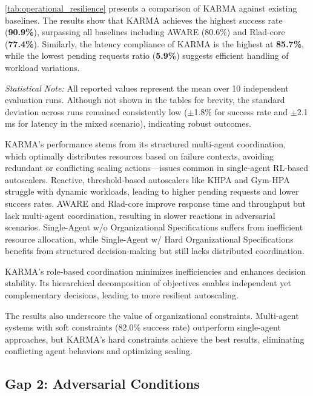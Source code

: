 \documentclass[conference]{IEEEtran}
\begin{document}
%
\autoref{tab:operational_resilience} presents a comparison of KARMA against existing baselines. The results show that KARMA achieves the highest success rate (\textbf{90.9\%}), surpassing all baselines including AWARE (80.6\%) and Rlad-core (\textbf{77.4\%}). Similarly, the latency compliance of KARMA is the highest at \textbf{85.7\%}, while the lowest pending requests ratio (\textbf{5.9\%}) suggests efficient handling of workload variations.

\noindent \textit{Statistical Note:} All reported values represent the mean over 10 independent evaluation runs. Although not shown in the tables for brevity, the standard deviation across runs remained consistently low ($\pm$1.8\% for success rate and $\pm$2.1 ms for latency in the mixed scenario), indicating robust outcomes.

KARMA's performance stems from its structured multi-agent coordination, which optimally distributes resources based on failure contexts, avoiding redundant or conflicting scaling actions—issues common in single-agent RL-based autoscalers.
%
Reactive, threshold-based autoscalers like KHPA and Gym-HPA struggle with dynamic workloads, leading to higher pending requests and lower success rates. AWARE and Rlad-core improve response time and throughput but lack multi-agent coordination, resulting in slower reactions in adversarial scenarios. Single-Agent w/o Organizational Specifications suffers from inefficient resource allocation, while Single-Agent w/ Hard Organizational Specifications benefits from structured decision-making but still lacks distributed coordination.

KARMA's role-based coordination minimizes inefficiencies and enhances decision stability. Its hierarchical decomposition of objectives enables independent yet complementary decisions, leading to more resilient autoscaling.

The results also underscore the value of organizational constraints. Multi-agent systems with soft constraints (82.0\% success rate) outperform single-agent approaches, but KARMA's hard constraints achieve the best results, eliminating conflicting agent behaviors and optimizing scaling.



\subsection{Gap 2: Adversarial Conditions}
\end{document}
